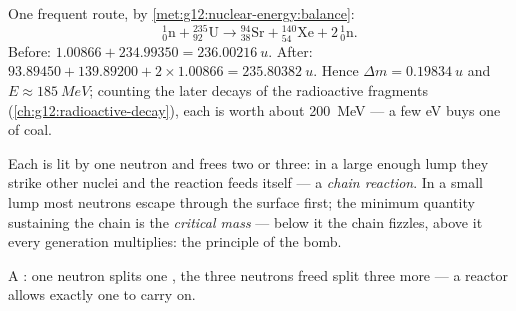\begin{example}\label{ex:g12:nuclear-energy:fissionbalance}
One frequent route, by \cref{met:g12:nuclear-energy:balance}:
\[
{}^{1}_{0}\mathrm{n} + {}^{235}_{92}\mathrm{U} \longrightarrow
{}^{94}_{38}\mathrm{Sr} + {}^{140}_{54}\mathrm{Xe} + 2\,{}^{1}_{0}\mathrm{n}.
\]
Before: $1.00866 + 234.99350 = \qty{236.00216}{u}$. After:
$93.89450 + 139.89200 + 2 \times 1.00866 = \qty{235.80382}{u}$. Hence
$\Delta m = \qty{0.19834}{u}$ and $E \approx \qty{185}{MeV}$; counting the
later decays of the radioactive fragments (\cref{ch:g12:radioactive-decay}),
each  is worth about \qty{200}{MeV} --- a few \unit{eV} buys one 
of coal.
\end{example}

\begin{definition}\label{def:g12:nuclear-energy:chain}
Each  is lit by one neutron and frees two or three: in a large enough
lump they strike other nuclei and the reaction feeds itself --- a
\emph{chain reaction}. In a small lump most neutrons
escape through the surface first; the minimum quantity sustaining the chain
is the \emph{critical mass} --- below it the chain
fizzles, above it every generation multiplies: the principle of the bomb.
\end{definition}

\begin{omfigure}

{\small A : one neutron splits one , the three neutrons
freed split three more --- a reactor allows exactly one to carry on.}
\end{omfigure}

